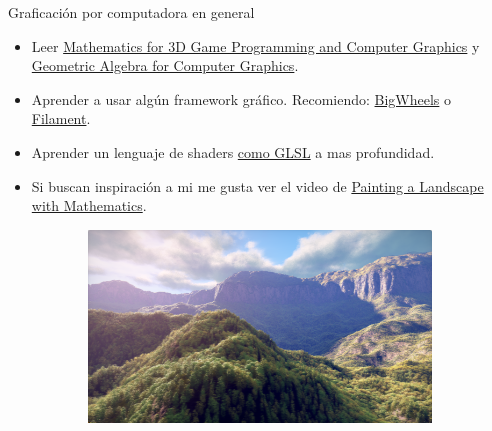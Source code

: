 \begin{frame}{Graficación por computadora en general}
\begin{itemize}
    \item Leer \href{https://www.amazon.com/Mathematics-Programming-Computer-Graphics-Third/dp/1435458869}{Mathematics for 3D Game Programming and Computer Graphics} y \href{https://link.springer.com/book/10.1007/978-1-84628-997-2}{Geometric Algebra for Computer Graphics}.
    \item Aprender a usar algún framework gráfico. Recomiendo: \href{https://github.com/google/bigwheels}{BigWheels} o \href{https://github.com/google/filament}{Filament}.
    \item Aprender un lenguaje de shaders \href{https://www.amazon.com/OpenGL-Shading-Language-Cookbook-high-quality/dp/1789342252/}{como GLSL} a mas profundidad.
    \item Si buscan inspiración a mi me gusta ver el video de \href{https://www.youtube.com/watch?v=BFld4EBO2RE}{Painting a Landscape with Mathematics}.
\end{itemize}
\begin{figure}[htp]
 \centering
 \begin{subfigure}[b]{0.3\textwidth}
   \includegraphics[width=\textwidth]{img/RainForest}
 \end{subfigure}
~
 \begin{subfigure}[b]{0.12\textwidth}

\end{subfigure}
\end{figure}
\end{frame}
